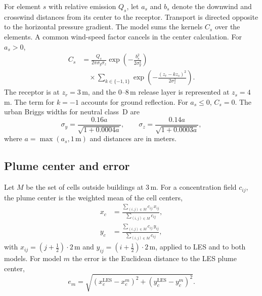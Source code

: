 \documentclass{article}
\begin{document}
For element $s$ with relative emission $Q_s$, let $a_s$ and $b_s$ denote
the downwind and crosswind distances from its center to the receptor.
Transport is directed opposite to the horizontal pressure gradient. The
model sums the kernels $C_s$ over the elements. A common wind-speed
factor cancels in the center calculation. For $a_s>0$,
\begin{equation}
  \begin{aligned}
    C_s &= \frac{Q_s}{2\pi\sigma_y\sigma_z}
          \exp\!\left(-\frac{b_s^2}{2\sigma_y^2}\right) \\
        &\quad \times \sum_{k\in\{-1,1\}}
          \exp\!\left(-\frac{(z_r-kz_s)^2}{2\sigma_z^2}\right).
  \end{aligned}
  \label{eq:gaussian}
\end{equation}
The receptor is at $z_r=3$\,m, and the 0--8\,m release layer is represented
at $z_s=4$\,m. The term for $k=-1$ accounts for ground reflection. For
$a_s\leq0$, $C_s=0$. The urban Briggs widths for neutral class~D
\citep[App.~D]{briggs1973}
\citep[\S1.1.5.1, Tables 1-3 and 1-4]{epa1995} are
\begin{equation}
  \sigma_y=\frac{0.16a}{\sqrt{1+0.0004a}},\qquad
  \sigma_z=\frac{0.14a}{\sqrt{1+0.0003a}},
  \label{eq:widths}
\end{equation}
where $a=\max(a_s,1\,\mathrm{m})$ and distances are in meters.

\subsection{Plume center and error}

Let $M$ be the set of cells outside buildings at 3\,m. For a concentration
field $c_{ij}$, the plume center is the weighted mean of the cell centers,
\begin{equation}
  \begin{aligned}
    x_c &= \frac{\sum_{(i,j)\in M} c_{ij}\,x_{ij}}
                {\sum_{(i,j)\in M} c_{ij}}, \\
    y_c &= \frac{\sum_{(i,j)\in M} c_{ij}\,y_{ij}}
                {\sum_{(i,j)\in M} c_{ij}},
  \end{aligned}
  \label{eq:centroid}
\end{equation}
with $x_{ij}=(j+\tfrac12)\cdot2$\,m and $y_{ij}=(i+\tfrac12)\cdot2$\,m, applied to
LES and to both models. For model $m$ the error is the Euclidean distance to the
LES plume center,
\begin{equation}
  e_m = \sqrt{\left(x_c^{\mathrm{LES}} - x_c^{m}\right)^2
            + \left(y_c^{\mathrm{LES}} - y_c^{m}\right)^2}.
  \label{eq:error}
\end{equation}
\end{document}
